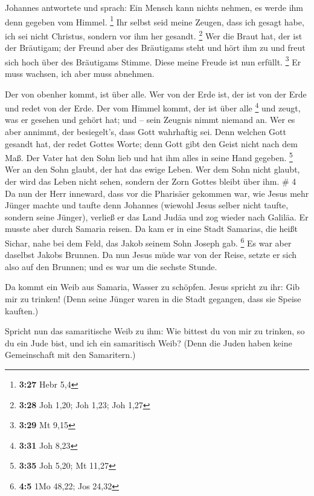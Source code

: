  Johannes antwortete und sprach: Ein Mensch kann nichts
nehmen, es werde ihm denn gegeben vom Himmel. \footnote{\textbf{3:27}
  Hebr 5,4}  Ihr selbst seid meine Zeugen, dass ich
gesagt habe, ich sei nicht Christus, sondern vor ihm her gesandt.
\footnote{\textbf{3:28} Joh 1,20; Joh 1,23; Joh 1,27} 
Wer die Braut hat, der ist der Bräutigam; der Freund aber des Bräutigams
steht und hört ihm zu und freut sich hoch über des Bräutigams Stimme.
Diese meine Freude ist nun erfüllt. \footnote{\textbf{3:29} Mt 9,15}
 Er muss wachsen, ich aber muss abnehmen.

 Der von obenher kommt, ist über alle. Wer von der Erde
ist, der ist von der Erde und redet von der Erde. Der vom Himmel kommt,
der ist über alle \footnote{\textbf{3:31} Joh 8,23}  und
zeugt, was er gesehen und gehört hat; und -- sein Zeugnis nimmt niemand
an.  Wer es aber annimmt, der besiegelt's, dass Gott
wahrhaftig sei.  Denn welchen Gott gesandt hat, der redet
Gottes Worte; denn Gott gibt den Geist nicht nach dem Maß.
 Der Vater hat den Sohn lieb und hat ihm alles in seine
Hand gegeben. \footnote{\textbf{3:35} Joh 5,20; Mt 11,27}
 Wer an den Sohn glaubt, der hat das ewige Leben. Wer dem
Sohn nicht glaubt, der wird das Leben nicht sehen, sondern der Zorn
Gottes bleibt über ihm. \# 4  Da nun der Herr inneward,
dass vor die Pharisäer gekommen war, wie Jesus mehr Jünger machte und
taufte denn Johannes  (wiewohl Jesus selber nicht taufte,
sondern seine Jünger),  verließ er das Land Judäa und zog
wieder nach Galiläa.  Er musste aber durch Samaria reisen.
 Da kam er in eine Stadt Samarias, die heißt Sichar, nahe
bei dem Feld, das Jakob seinem Sohn Joseph gab. \footnote{\textbf{4:5}
  1Mo 48,22; Jos 24,32}  Es war aber daselbst Jakobs
Brunnen. Da nun Jesus müde war von der Reise, setzte er sich also auf
den Brunnen; und es war um die sechste Stunde.

 Da kommt ein Weib aus Samaria, Wasser zu schöpfen. Jesus
spricht zu ihr: Gib mir zu trinken!  (Denn seine Jünger
waren in die Stadt gegangen, dass sie Speise kauften.)

 Spricht nun das samaritische Weib zu ihm: Wie bittest du
von mir zu trinken, so du ein Jude bist, und ich ein samaritisch Weib?
(Denn die Juden haben keine Gemeinschaft mit den Samaritern.)

